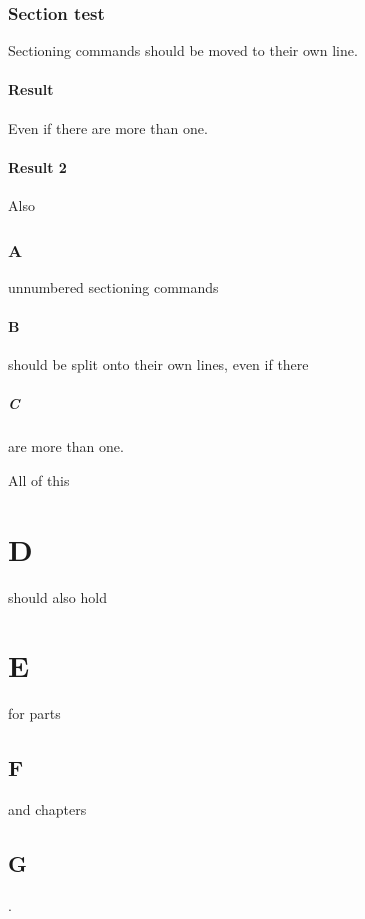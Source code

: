\section{Section test}

Sectioning commands should be moved to their own line.\subsection{Result} Even if there are more than one.\subsection{Result 2}

Also \section*{A} unnumbered sectioning commands \subsection*{B} should be split onto their own lines, even if there \subsubsection*{C} are more than one.

All of this \part{D} should also hold \part*{E} for parts \chapter{F} and chapters \chapter*{G}.
